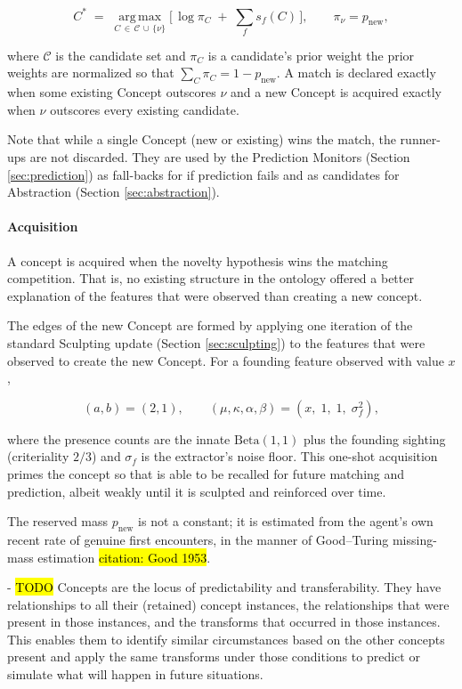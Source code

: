 \documentclass{article}
\begin{document}
$$
C^{*} \;=\; \operatorname*{arg\,max}_{C \,\in\, \mathcal{C} \,\cup\, \{\nu\}} \Big[\, \log \pi_C \;+\; \sum_{f} s_f(C) \,\Big],
\qquad \pi_\nu = p_{\mathrm{new}},
$$

where $\mathcal{C}$ is the candidate set and $\pi_C$ is a candidate's prior weight the prior weights are normalized so that $\sum_C \pi_C = 1 - p_{\mathrm{new}}$. A match is declared exactly when some existing Concept outscores $\nu$ and a new Concept is acquired exactly when $\nu$ outscores every existing candidate.

Note that while a single Concept (new or existing) wins the match, the runner-ups are not discarded. They are used by the Prediction Monitors (Section \ref{sec:prediction}) as fall-backs for if prediction fails and as candidates for Abstraction (Section \ref{sec:abstraction}).

\paragraph{Acquisition}
A concept is acquired when the novelty hypothesis wins the matching competition. That is, no existing structure in the ontology offered a better explanation of the features that were observed than creating a new concept.

The edges of the new Concept are formed by applying one iteration of the standard Sculpting update (Section \ref{sec:sculpting}) to the features that were observed to create the new Concept. For a founding feature observed with value $x$,

$$
(a, b) = (2, 1), \qquad (\mu, \kappa, \alpha, \beta) = \left(x,\; 1,\; 1,\; \sigma_f^2\right),
$$

where the presence counts are the innate $\mathrm{Beta}(1,1)$ plus the founding sighting (criteriality $2/3$) and $\sigma_f$ is the extractor's noise floor. This one-shot acquisition primes the concept so that is able to be recalled for future matching and prediction, albeit weakly until it is sculpted and reinforced over time.

The reserved mass $p_{\mathrm{new}}$ is not a constant; it is estimated from the agent's own recent rate of genuine first encounters, in the manner of Good--Turing missing-mass estimation \hl{citation: Good 1953}.

- \hl{TODO} Concepts are the locus of predictability and transferability. They have relationships to all their (retained) concept instances, the relationships that were present in those instances, and the transforms that occurred in those instances. This enables them to identify similar circumstances based on the other concepts present and apply the same transforms under those conditions to predict or simulate what will happen in future situations.
\end{document}
